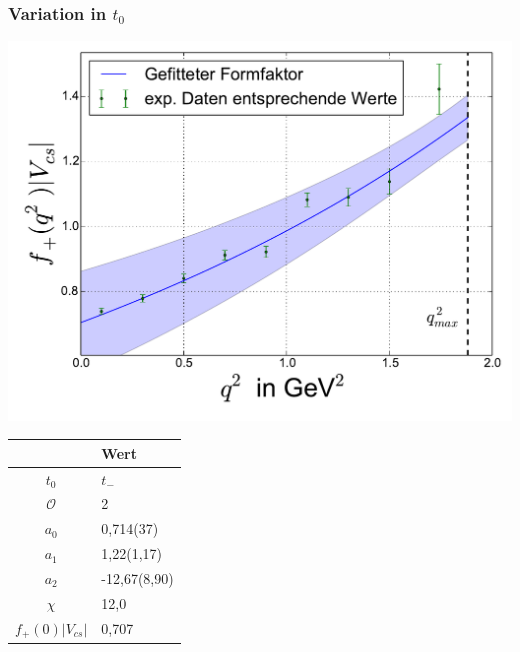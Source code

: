 \documentclass[hyperref={pdfpagelabels=false}]{beamer}
\begin{document}
\begin{frame}
 \frametitle{Variation in $t_0$}
 \begin{minipage}[h]{0.66\textwidth}
  \includegraphics[width=1.0\textwidth]{../Fit/D+-2O-tmin.pdf}
 \end{minipage}
 \begin{minipage}[h]{0.32\textwidth}
  \begin{table}[h]
   \begin{tabular}{c|l}
   \toprule
     & Wert\\
    \midrule
    $t_0$ & $t_-$\\
    $\mathcal{O}$ & 2\\
    \midrule
    $a_0$ & 0,714(37)\\
    $a_1$ & 1,22(1,17)\\
    $a_2$ & -12,67(8,90)\\
    \midrule
    $\chi$ & 12,0\\
    $f_+(0)|V_{cs}|$ & 0,707\\
    \bottomrule\bottomrule
   \end{tabular}

  \end{table}

 \end{minipage}
\end{frame}
\end{document}

